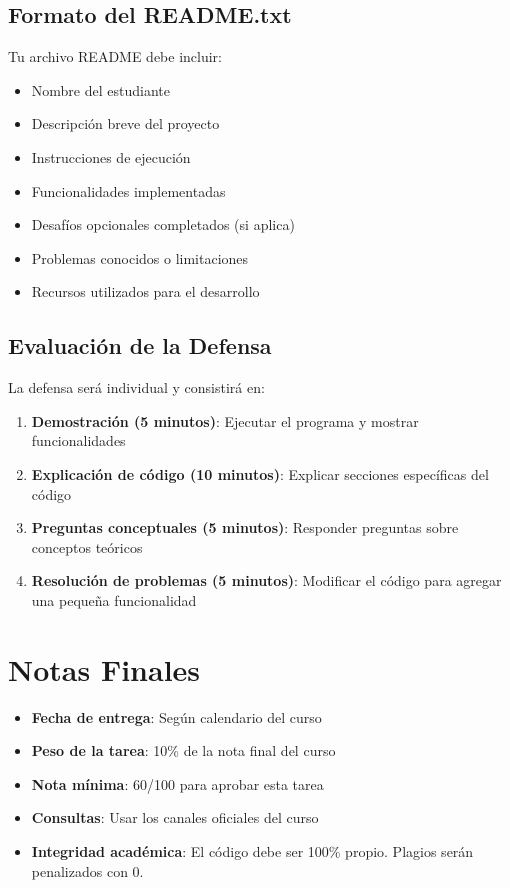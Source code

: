 \documentclass[11pt,letterpaper]{article}
\begin{document}
\subsection{Formato del README.txt}

Tu archivo README debe incluir:

\begin{itemize}
    \item Nombre del estudiante
    \item Descripción breve del proyecto
    \item Instrucciones de ejecución
    \item Funcionalidades implementadas
    \item Desafíos opcionales completados (si aplica)
    \item Problemas conocidos o limitaciones
    \item Recursos utilizados para el desarrollo
\end{itemize}

\subsection{Evaluación de la Defensa}

La defensa será individual y consistirá en:

\begin{enumerate}
    \item \textbf{Demostración (5 minutos)}: Ejecutar el programa y mostrar funcionalidades
    \item \textbf{Explicación de código (10 minutos)}: Explicar secciones específicas del código
    \item \textbf{Preguntas conceptuales (5 minutos)}: Responder preguntas sobre conceptos teóricos
    \item \textbf{Resolución de problemas (5 minutos)}: Modificar el código para agregar una pequeña funcionalidad
\end{enumerate}

\section{Notas Finales}

\begin{itemize}
    \item \textbf{Fecha de entrega}: Según calendario del curso
    \item \textbf{Peso de la tarea}: 10\% de la nota final del curso
    \item \textbf{Nota mínima}: 60/100 para aprobar esta tarea
    \item \textbf{Consultas}: Usar los canales oficiales del curso
    \item \textbf{Integridad académica}: El código debe ser 100\% propio. Plagios serán penalizados con 0.
\end{itemize}
\end{document}
